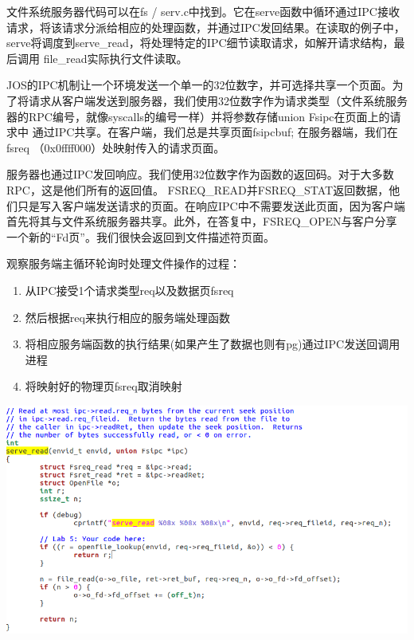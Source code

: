\begin{ExerciseList}
  文件系统服务器代码可以在fs / serv.c中找到。它在serve函数中循环通过IPC接收请求，将该请求分派给相应的处理函数，并通过IPC发回结果。在读取的例子中， serve将调度到serve\_read，将处理特定的IPC细节读取请求，如解开请求结构，最后调用 file\_read实际执行文件读取。

  JOS的IPC机制让一个环境发送一个单一的32位数字，并可选择共享一个页面。为了将请求从客户端发送到服务器，我们使用32位数字作为请求类型（文件系统服务器的RPC编号，就像syscalls的编号一样）并将参数存储union Fsipc在页面上的请求中 通过IPC共享。在客户端，我们总是共享页面fsipcbuf; 在服务器端，我们在fsreq （0x0ffff000）处映射传入的请求页面。

  服务器也通过IPC发回响应。我们使用32位数字作为函数的返回码。对于大多数RPC，这是他们所有的返回值。 FSREQ\_READ并FSREQ\_STAT返回数据，他们只是写入客户端发送请求的页面。在响应IPC中不需要发送此页面，因为客户端首先将其与文件系统服务器共享。此外，在答复中，FSREQ\_OPEN与客户分享一个新的“Fd页”。我们很快会返回到文件描述符页面。

  观察服务端主循环轮询时处理文件操作的过程：

  \begin{enumerate}
  \item 从IPC接受1个请求类型req以及数据页fsreq
  \item 然后根据req来执行相应的服务端处理函数
  \item 将相应服务端函数的执行结果(如果产生了数据也则有pg)通过IPC发送回调用进程
  \item 将映射好的物理页fsreq取消映射
  \end{enumerate}


  \includegraphics[width=6in]{figures/lab5/image80.png}


\end{ExerciseList}
